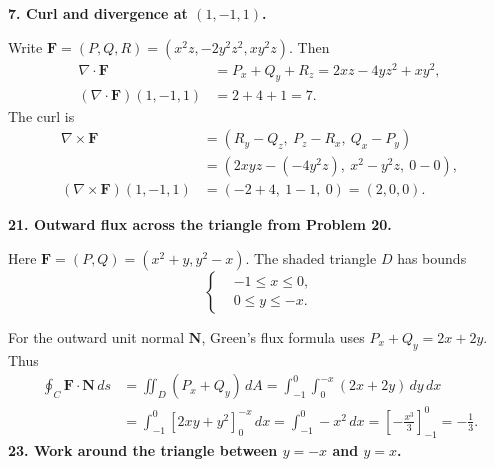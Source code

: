 \documentclass[12pt,letterpaper]{article}
\begin{document}
\medskip
\textbf{7. Curl and divergence at $(1,-1,1)$.}

Write $\mathbf F=(P,Q,R)=(x^2z,-2y^2z^2,xy^2z)$. Then
\[
\begin{aligned}
\nabla\cdot\mathbf F
  &=P_x+Q_y+R_z=2xz-4yz^2+xy^2,\\
(\nabla\cdot\mathbf F)(1,-1,1)
  &=2+4+1=\boxed{7}.
\end{aligned}
\]
The curl is
\[
\begin{aligned}
\nabla\times\mathbf F
  &=(R_y-Q_z,\ P_z-R_x,\ Q_x-P_y)\\
  &=(2xyz-(-4y^2z),\ x^2-y^2z,\ 0-0),\\
(\nabla\times\mathbf F)(1,-1,1)
  &=(-2+4,\ 1-1,\ 0)=\boxed{(2,0,0)}.
\end{aligned}
\]

\medskip
\textbf{21. Outward flux across the triangle from Problem 20.}

\noindent\begin{minipage}[c]{0.56\linewidth}
\raggedright
Here $\mathbf F=(P,Q)=(x^2+y,y^2-x)$.
The shaded triangle $D$ has bounds
\[
\left\{
\begin{aligned}
&-1\leq x\leq0,\\
&0\leq y\leq-x.
\end{aligned}
\right.
\]
\end{minipage}\hfill
\begin{minipage}[c]{0.40\linewidth}
\centering
{}
\end{minipage}

For the outward unit normal $\mathbf N$, Green's flux formula uses
$P_x+Q_y=2x+2y$. Thus
\[
\begin{aligned}
\oint_C\mathbf F\cdot\mathbf N\,ds
 &=\iint_D(P_x+Q_y)\,dA
   =\int_{-1}^0\int_0^{-x}(2x+2y)\,dy\,dx\\
 &=\int_{-1}^0[2xy+y^2]_0^{-x}\,dx
   =\int_{-1}^0-x^2\,dx
   =\left[-\frac{x^3}{3}\right]_{-1}^0
   =\boxed{-\frac13}.
\end{aligned}
\]
\medskip
\textbf{23. Work around the triangle between $y=-x$ and $y=x$.}
\end{document}
